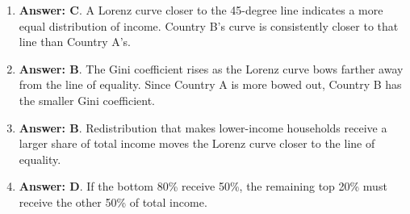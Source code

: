 \documentclass[10pt]{article}
\begin{document}
\begin{enumerate}[resume*=curves, leftmargin=*, itemsep=0.58em, topsep=0.18em, parsep=0pt]
\item \textbf{Answer: C}. A Lorenz curve closer to the 45-degree line indicates a more equal distribution of income. Country B's curve is consistently closer to that line than Country A's.
\item \textbf{Answer: B}. The Gini coefficient rises as the Lorenz curve bows farther away from the line of equality. Since Country A is more bowed out, Country B has the smaller Gini coefficient.
\item \textbf{Answer: B}. Redistribution that makes lower-income households receive a larger share of total income moves the Lorenz curve closer to the line of equality.
\item \textbf{Answer: D}. If the bottom 80\% receive 50\%, the remaining top 20\% must receive the other 50\% of total income.
\end{enumerate}
\end{document}

